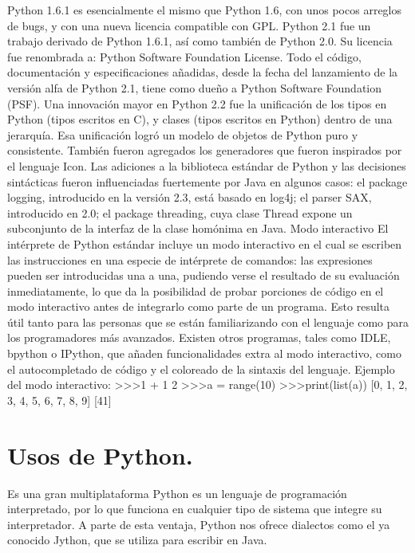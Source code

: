 \documentclass[12pt]{article}
\begin{document}
Python 1.6.1 es esencialmente el mismo que Python 1.6, con unos pocos arreglos de bugs, y con una nueva licencia compatible con GPL.
Python 2.1 fue un trabajo derivado de Python 1.6.1, así como también de Python 2.0. Su licencia fue renombrada a: Python Software Foundation License. Todo el código, documentación y especificaciones añadidas, desde la fecha del lanzamiento de la versión alfa de Python 2.1, tiene como dueño a Python Software Foundation (PSF).
Una innovación mayor en Python 2.2 fue la unificación de los tipos en Python (tipos escritos en C), y clases (tipos escritos en Python) dentro de una jerarquía. Esa unificación logró un modelo de objetos de Python puro y consistente. También fueron agregados los generadores que fueron inspirados por el lenguaje Icon.
Las adiciones a la biblioteca estándar de Python y las decisiones sintácticas fueron influenciadas fuertemente por Java en algunos casos: el package logging, introducido en la versión 2.3, está basado en log4j; el parser SAX, introducido en 2.0; el package threading, cuya clase Thread expone un subconjunto de la interfaz de la clase homónima en Java.
Modo interactivo
El intérprete de Python estándar incluye un modo interactivo en el cual se escriben las instrucciones en una especie de intérprete de comandos: las expresiones pueden ser introducidas una a una, pudiendo verse el resultado de su evaluación inmediatamente, lo que da la posibilidad de probar porciones de código en el modo interactivo antes de integrarlo como parte de un programa. Esto resulta útil tanto para las personas que se están familiarizando con el lenguaje como para los programadores más avanzados.
Existen otros programas, tales como IDLE, bpython o IPython, que añaden funcionalidades extra al modo interactivo, como el autocompletado de código y el coloreado de la sintaxis del lenguaje.
Ejemplo del modo interactivo:
\textgreater\textgreater\textgreater 1 + 1
2
\textgreater\textgreater\textgreater a = range(10)
\textgreater\textgreater\textgreater print(list(a))
[0, 1, 2, 3, 4, 5, 6, 7, 8, 9]
[41]



\section{Usos de Python.}

Es una gran multiplataforma
Python es un lenguaje de programación interpretado, por lo que funciona en cualquier tipo de sistema que integre su interpretador.  A parte de esta ventaja, Python nos ofrece dialectos como el ya conocido Jython, que se utiliza para escribir en Java.
 
\end{document}
